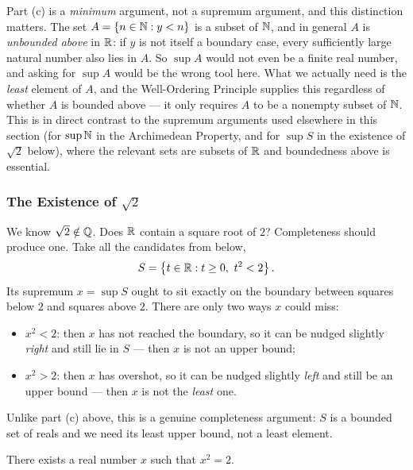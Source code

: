 \begin{remark}
    Part (c) is a \emph{minimum} argument, not a supremum argument, and this distinction matters. The set $A=\left\{n\in\mathbb{N}:y<n\right\}$ is a subset of $\mathbb{N}$, and in general $A$ is \emph{unbounded above} in $\mathbb{R}$: if $y$ is not itself a boundary case, every sufficiently large natural number also lies in $A$. So $\sup A$ would not even be a finite real number, and asking for $\sup A$ would be the wrong tool here. What we actually need is the \emph{least} element of $A$, and the Well-Ordering Principle supplies this regardless of whether $A$ is bounded above — it only requires $A$ to be a nonempty subset of $\mathbb{N}$. This is in direct contrast to the supremum arguments used elsewhere in this section (for $\sup\mathbb{N}$ in the Archimedean Property, and for $\sup S$ in the existence of $\sqrt2$ below), where the relevant sets are subsets of $\mathbb{R}$ and boundedness above is essential.
\end{remark}

\subsubsection{The Existence of \texorpdfstring{$\sqrt2$}{sqrt(2)}}
We know $\sqrt2\notin\mathbb{Q}$. Does $\mathbb{R}$ contain a square root of $2$? Completeness should produce one. Take all the candidates from below,
\[
    S=\set{t\in\R : t\geq0,\ t^2<2}.
\]
Its supremum $x=\sup S$ ought to sit exactly on the boundary between squares below $2$ and squares above $2$. There are only two ways $x$ could miss:
\begin{itemize}
    \item $x^2<2$: then $x$ has not reached the boundary, so it can be nudged slightly \emph{right} and still lie in $S$ --- then $x$ is not an upper bound;
    \item $x^2>2$: then $x$ has overshot, so it can be nudged slightly \emph{left} and still be an upper bound --- then $x$ is not the \emph{least} one.
\end{itemize}
Unlike part (c) above, this is a genuine completeness argument: $S$ is a bounded set of reals and we need its least upper bound, not a least element.

\begin{proposition}\label{prop:sqrt2-exists}
    There exists a real number $x$ such that $x^2 = 2$.
\end{proposition}

